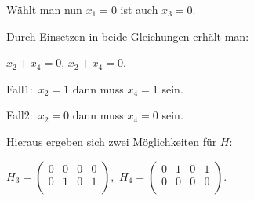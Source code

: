 \begin{Beispiel}
    Wählt man nun $x_1=0$ ist auch $x_3=0$.
    
    Durch Einsetzen in beide Gleichungen erhält man:
    
    $x_2+x_4=0$,
    $x_2+x_4=0$.
    
    Fall$1:$ $x_2=1$ dann muss $x_4=1$ sein. 
    
    Fall$2:$ $x_2=0$ dann muss $x_4=0$ sein.
    
    Hieraus ergeben sich zwei Möglichkeiten für $H$:
    
    
    $H_3=\left( \begin{array}{rrrr}
        0 & 0 & 0 & 0 \\
        0 & 1 & 0 & 1 \\
       \end{array}\right),
    $
    $H_4=\left( \begin{array}{rrrr}
    0 & 1 & 0 & 1 \\
    0 & 0 & 0 & 0 \\
    \end{array}\right).
    $\\
\end{Beispiel}


